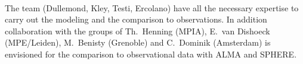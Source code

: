 \vspace{0.5em}
\\
The team (Dullemond, Kley, Testi, Ercolano) have all the necessary expertise
to carry out the modeling and the comparison to observations. In addition
collaboration with the groups of Th.~Henning (MPIA), E.~van Dishoeck
(MPE/Leiden), M.~Benisty (Grenoble) and C.~Dominik (Amsterdam) is envisioned
for the comparison to observational data with ALMA and SPHERE.



